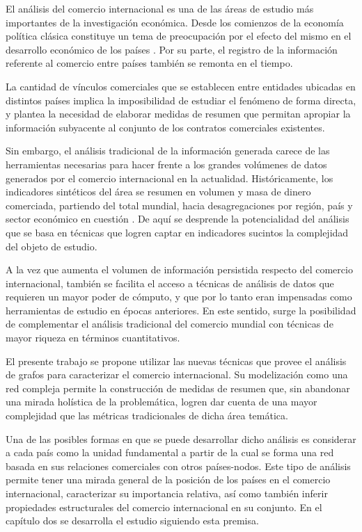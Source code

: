 \documentclass[class=article, crop=false]{standalone}
\begin{document}
El análisis del comercio internacional es una de las áreas de estudio más importantes de la investigación económica. Desde los comienzos de la economía política clásica constituye un tema de preocupación por el efecto del mismo en el desarrollo económico de los países \citep{ricardo1987principios}. Por su parte, el registro de la información referente al comercio entre países también se remonta en el tiempo.          

La cantidad de vínculos comerciales que se establecen entre entidades ubicadas en distintos países implica la imposibilidad de estudiar el fenómeno de forma directa, y plantea la necesidad de elaborar medidas de resumen que permitan apropiar la información subyacente al conjunto de los contratos comerciales existentes. 

Sin embargo, el análisis tradicional de la información generada carece de las herramientas necesarias para hacer frente a los grandes volúmenes de datos generados por el comercio internacional en la actualidad. Históricamente, los indicadores sintéticos del área se resumen en volumen y masa de dinero comerciada, partiendo del total mundial, hacia desagregaciones por región, país y sector económico en cuestión \cite{WTO2017}. De aquí se desprende la potencialidad del análisis que se basa en técnicas que logren captar en indicadores sucintos la complejidad del objeto de estudio.

A la vez que aumenta el volumen de información persistida respecto del comercio internacional, también se facilita el acceso a técnicas de análisis de datos que requieren un mayor poder de cómputo, y que por lo tanto eran impensadas como herramientas de estudio en épocas anteriores. En este sentido, surge la posibilidad de complementar el análisis tradicional del comercio mundial con técnicas de mayor riqueza en términos cuantitativos. 

El presente trabajo se propone utilizar las nuevas técnicas que provee el análisis de grafos para caracterizar el comercio internacional. Su modelización como una red compleja permite la construcción de medidas de resumen que, sin abandonar una mirada holística de la problemática, logren dar cuenta de una mayor complejidad que las métricas tradicionales de dicha área temática. 

Una de las posibles formas en que se puede desarrollar dicho análisis es considerar a cada país como la unidad fundamental a partir de la cual se forma una red basada en sus relaciones comerciales con otros países-nodos. Este tipo de análisis permite tener una mirada general de la posición de los países en el comercio internacional, caracterizar su importancia relativa, así como también inferir propiedades estructurales del comercio internacional en su conjunto. En el capítulo dos se desarrolla el estudio siguiendo esta premisa. 
\end{document}
